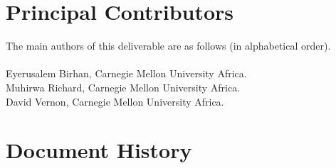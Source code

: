 \documentclass{CSSRforAfrica}
\newcommand{\blank}{~\\}
\begin{document}
\newpage


 

\pagebreak
\section*{Principal Contributors}
\label{contributors}
The main authors of this deliverable are as follows (in alphabetical order).
\blank
~
\blank
Eyerusalem Birhan, Carnegie Mellon University Africa.\\    
Muhirwa Richard, Carnegie Mellon University Africa.\\   
David Vernon, Carnegie Mellon University Africa.\\   


  

\newpage
\section*{Document History}
\label{document_history}
\end{document}
